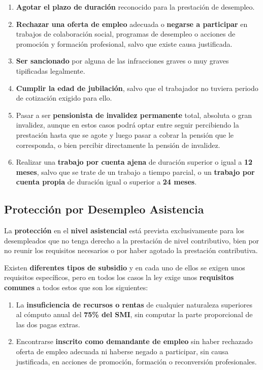 \begin{enumerate}
    \item \textbf{Agotar el plazo de duración} reconocido para la prestación de desempleo.
    \item \textbf{Rechazar una oferta de empleo} adecuada o \textbf{negarse a participar} en trabajos de colaboración social, programas de desempleo o acciones de promoción y formación profesional, salvo que existe causa justificada.
    \item \textbf{Ser sancionado} por alguna de las infracciones graves o muy graves tipificadas legalmente.
    \item \textbf{Cumplir la edad de jubilación}, salvo que el trabajador no tuviera periodo de cotización exigido para ello.
    \item Pasar a ser \textbf{pensionista de invalidez permanente} total, absoluta o gran invalidez, aunque en estos casos podrá optar entre seguir percibiendo la prestación hasta que se agote y luego pasar a cobrar la pensión que le corresponda, o bien percibir directamente la pensión de invalidez.
    \item Realizar una \textbf{trabajo por cuenta ajena} de duración superior o igual a \textbf{12 meses}, salvo que se trate de un trabajo a tiempo parcial, o un \textbf{trabajo por cuenta propia} de duración igual o superior a \textbf{24 meses}.
\end{enumerate}

\subsection{Protección por Desempleo Asistencia}
La \textbf{protección} en el \textbf{nivel asistencial} está prevista exclusivamente para los desempleados que no tenga derecho a la prestación de nivel contributivo, bien por no reunir los requisitos necesarios o por haber agotado la prestación contributiva.

Existen \textbf{diferentes tipos de subsidio} y en cada uno de ellos se exigen unos requisitos específicos, pero en todos los casos la ley exige unos \textbf{requisitos comunes} a todos estos que son los siguientes:

\begin{enumerate}
    \item La \textbf{insuficiencia de recursos o rentas} de cualquier naturaleza superiores al cómputo anual del \textbf{75\% del SMI}, sin computar la parte proporcional de las dos pagas extras.
    \item Encontrarse \textbf{inscrito como demandante de empleo} sin haber rechazado oferta de empleo adecuada ni haberse negado a participar, sin causa justificada, en acciones de promoción, formación o reconversión profesionales.
\end{enumerate}

